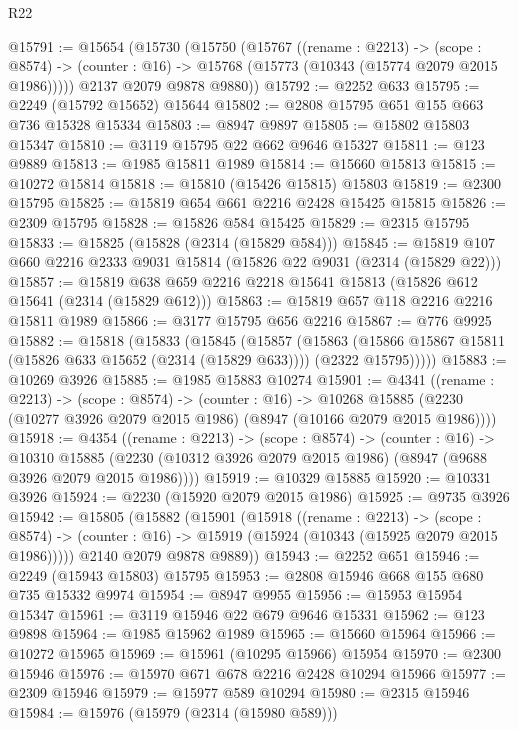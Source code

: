 \begin{lexlean}{R22}
\begin{coremodule}
@15791 := @15654
    (@15730
      (@15750
        (@15767
          ((rename : @2213) ->
          (scope : @8574) ->
          (counter : @16) -> @15768 (@15773 (@10343 (@15774 @2079 @2015 @1986)))))
        @2137
        @2079
        @9878
        @9880))
@15792 := @2252 @633
@15795 := @2249 (@15792 @15652) @15644
@15802 := @2808 @15795 @651 @155 @663 @736 @15328 @15334
@15803 := @8947 @9897
@15805 := @15802 @15803 @15347
@15810 := @3119 @15795 @22 @662 @9646 @15327
@15811 := @123 @9889
@15813 := @1985 @15811 @1989
@15814 := @15660 @15813
@15815 := @10272 @15814
@15818 := @15810 (@15426 @15815) @15803
@15819 := @2300 @15795
@15825 := @15819 @654 @661 @2216 @2428 @15425 @15815
@15826 := @2309 @15795
@15828 := @15826 @584 @15425
@15829 := @2315 @15795
@15833 := @15825 (@15828 (@2314 (@15829 @584)))
@15845 := @15819 @107 @660 @2216 @2333 @9031 @15814 (@15826 @22 @9031 (@2314 (@15829 @22)))
@15857 := @15819 @638 @659 @2216 @2218 @15641 @15813 (@15826 @612 @15641 (@2314 (@15829 @612)))
@15863 := @15819 @657 @118 @2216 @2216 @15811 @1989
@15866 := @3177 @15795 @656 @2216
@15867 := @776 @9925
@15882 := @15818
    (@15833
      (@15845
        (@15857
          (@15863
            (@15866 @15867 @15811 (@15826 @633 @15652 (@2314 (@15829 @633))))
            (@2322 @15795)))))
@15883 := @10269 @3926
@15885 := @1985 @15883 @10274
@15901 := @4341
    ((rename : @2213) ->
    (scope : @8574) ->
    (counter : @16) ->
    @10268 @15885 (@2230 (@10277 @3926 @2079 @2015 @1986) (@8947 (@10166 @2079 @2015 @1986))))
@15918 := @4354
    ((rename : @2213) ->
    (scope : @8574) ->
    (counter : @16) ->
    @10310 @15885 (@2230 (@10312 @3926 @2079 @2015 @1986) (@8947 (@9688 @3926 @2079 @2015 @1986))))
@15919 := @10329 @15885
@15920 := @10331 @3926
@15924 := @2230 (@15920 @2079 @2015 @1986)
@15925 := @9735 @3926
@15942 := @15805
    (@15882
      (@15901
        (@15918
          ((rename : @2213) ->
          (scope : @8574) ->
          (counter : @16) -> @15919 (@15924 (@10343 (@15925 @2079 @2015 @1986)))))
        @2140
        @2079
        @9878
        @9889))
@15943 := @2252 @651
@15946 := @2249 (@15943 @15803) @15795
@15953 := @2808 @15946 @668 @155 @680 @735 @15332 @9974
@15954 := @8947 @9955
@15956 := @15953 @15954 @15347
@15961 := @3119 @15946 @22 @679 @9646 @15331
@15962 := @123 @9898
@15964 := @1985 @15962 @1989
@15965 := @15660 @15964
@15966 := @10272 @15965
@15969 := @15961 (@10295 @15966) @15954
@15970 := @2300 @15946
@15976 := @15970 @671 @678 @2216 @2428 @10294 @15966
@15977 := @2309 @15946
@15979 := @15977 @589 @10294
@15980 := @2315 @15946
@15984 := @15976 (@15979 (@2314 (@15980 @589)))

\end{coremodule}
\end{lexlean}
